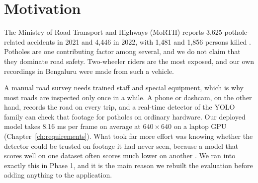 \section{Motivation}
The Ministry of Road Transport and Highways (MoRTH) reports 3,625 pothole-related accidents in 2021 and 4,446 in 2022, with 1,481 and 1,856 persons killed \cite{morth2023road}. Potholes are one contributing factor among several, and we do not claim that they dominate road safety. Two-wheeler riders are the most exposed, and our own recordings in Bengaluru were made from such a vehicle.

A manual road survey needs trained staff and special equipment, which is why most roads are inspected only once in a while. A phone or dashcam, on the other hand, records the road on every trip, and a real-time detector of the YOLO family \cite{redmon2016yolo,jocher2023yolov8} can check that footage for potholes on ordinary hardware. Our deployed model takes 8.16 ms per frame on average at $640 \times 640$ on a laptop GPU (Chapter~\ref{ch:requirements}). What took far more effort was knowing whether the detector could be trusted on footage it had never seen, because a model that scores well on one dataset often scores much lower on another \cite{torralba2011unbiased,koh2021wilds}. We ran into exactly this in Phase 1, and it is the main reason we rebuilt the evaluation before adding anything to the application.

